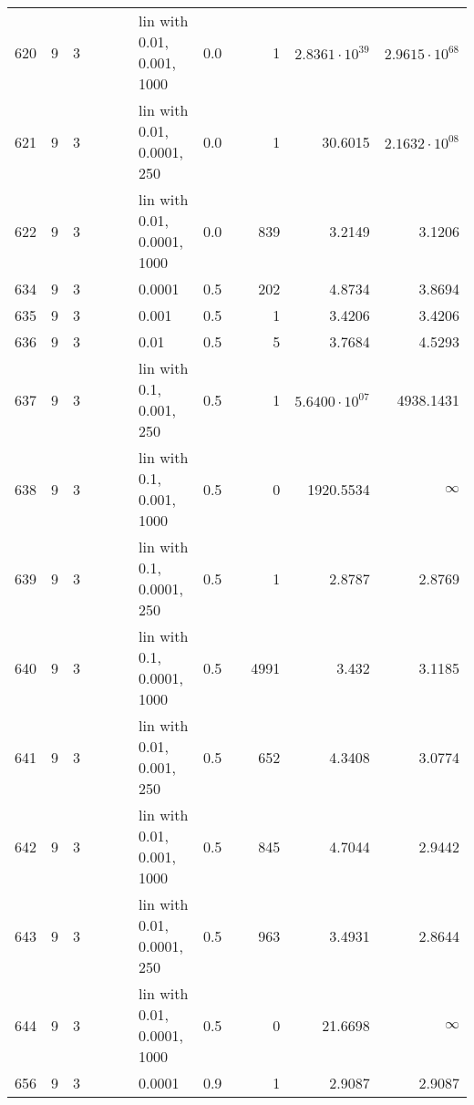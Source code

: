 \begin{longtable}{lrrrrrlrrrrr}
  620 &       9 & 3 &   &   &   &  lin with 0.01, 0.001, 1000 &      0.0 &        &       1 &  $2.8361\cdot 10^{39}$ &  $2.9615\cdot 10^{68}$ \\
  621 &       9 & 3 &   &   &   &  lin with 0.01, 0.0001, 250 &      0.0 &        &       1 &                30.6015 &  $2.1632\cdot 10^{08}$ \\
  622 &       9 & 3 &   &   &   & lin with 0.01, 0.0001, 1000 &      0.0 &        &     839 &                 3.2149 &                 3.1206 \\
  634 &       9 & 3 &   &   &   &                      0.0001 &      0.5 &        &     202 &                 4.8734 &                 3.8694 \\
  635 &       9 & 3 &   &   &   &                       0.001 &      0.5 &        &       1 &                 3.4206 &                 3.4206 \\
  636 &       9 & 3 &   &   &   &                        0.01 &      0.5 &        &       5 &                 3.7684 &                 4.5293 \\
  637 &       9 & 3 &   &   &   &    lin with 0.1, 0.001, 250 &      0.5 &        &       1 &  $5.6400\cdot 10^{07}$ &              4938.1431 \\
  638 &       9 & 3 &   &   &   &   lin with 0.1, 0.001, 1000 &      0.5 &        &       0 &              1920.5534 &               $\infty$ \\
  639 &       9 & 3 &   &   &   &   lin with 0.1, 0.0001, 250 &      0.5 &        &       1 &                 2.8787 &                 2.8769 \\
  640 &       9 & 3 &   &   &   &  lin with 0.1, 0.0001, 1000 &      0.5 &        &    4991 &                  3.432 &                 3.1185 \\
  641 &       9 & 3 &   &   &   &   lin with 0.01, 0.001, 250 &      0.5 &        &     652 &                 4.3408 &                 3.0774 \\
  642 &       9 & 3 &   &   &   &  lin with 0.01, 0.001, 1000 &      0.5 &        &     845 &                 4.7044 &                 2.9442 \\
  643 &       9 & 3 &   &   &   &  lin with 0.01, 0.0001, 250 &      0.5 &        &     963 &                 3.4931 &                 2.8644 \\
  644 &       9 & 3 &   &   &   & lin with 0.01, 0.0001, 1000 &      0.5 &        &       0 &                21.6698 &               $\infty$ \\
  656 &       9 & 3 &   &   &   &                      0.0001 &      0.9 &        &       1 &                 2.9087 &                 2.9087 \\

\end{longtable}
